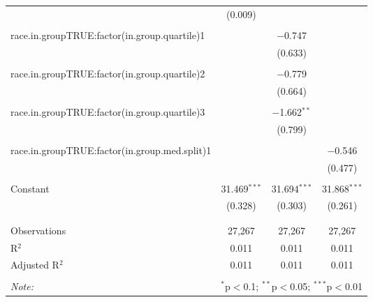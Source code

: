 \begin{table}[!htbp]
\begin{tabular}{@{\extracolsep{5pt}}lccc}
  & (0.009) &  &  \\ 
  & & & \\ 
 race.in.groupTRUE:factor(in.group.quartile)1 &  & $-$0.747 &  \\ 
  &  & (0.633) &  \\ 
  & & & \\ 
 race.in.groupTRUE:factor(in.group.quartile)2 &  & $-$0.779 &  \\ 
  &  & (0.664) &  \\ 
  & & & \\ 
 race.in.groupTRUE:factor(in.group.quartile)3 &  & $-$1.662$^{**}$ &  \\ 
  &  & (0.799) &  \\ 
  & & & \\ 
 race.in.groupTRUE:factor(in.group.med.split)1 &  &  & $-$0.546 \\ 
  &  &  & (0.477) \\ 
  & & & \\ 
 Constant & 31.469$^{***}$ & 31.694$^{***}$ & 31.868$^{***}$ \\ 
  & (0.328) & (0.303) & (0.261) \\ 
  & & & \\ 
\hline \\[-1.8ex] 
Observations & 27,267 & 27,267 & 27,267 \\ 
R$^{2}$ & 0.011 & 0.011 & 0.011 \\ 
Adjusted R$^{2}$ & 0.011 & 0.011 & 0.011 \\ 
\hline 
\hline \\[-1.8ex] 
\textit{Note:}  & \multicolumn{3}{r}{$^{*}$p$<$0.1; $^{**}$p$<$0.05; $^{***}$p$<$0.01} \\ 
\end{tabular} 
\end{table} 
